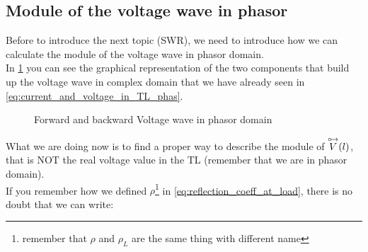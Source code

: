 \subsection*{Module of the voltage wave in phasor}
Before to introduce the next topic (SWR), we need to introduce how we can calculate the module of the voltage wave in phasor domain.\\
In \cref{fig:voltage_components_in_phas} you can see the graphical representation of the two components that build up the voltage wave in complex domain that we have already seen in \cref{eq:current_and_voltage_in_TL_phas}.
\begin{figure}[H]    
    \begin{center}
    \end{center}\caption{Forward and backward Voltage wave in phasor domain}\label{fig:voltage_components_in_phas}
\end{figure}
What we are doing now is to find a proper way to describe the module of $\overset{\mathbin {{\circ \mkern-2.5mu\rightarrow}}}{V}(l)$, that is NOT the real voltage value in the TL (remember that we are in phasor domain).\\
If you remember how we defined $\rho$\footnote{remember that $\rho$ and $\rho_L$ are the same thing with different name} in \cref{eq:reflection_coeff_at_load}, there is no doubt that we can write:
